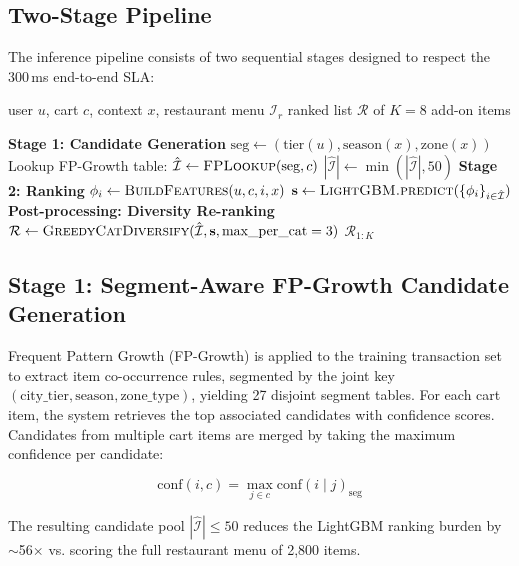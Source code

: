\documentclass[conference]{IEEEtran}
\begin{document}
\subsection{Two-Stage Pipeline}

The inference pipeline consists of two sequential stages designed to respect
the 300\,ms end-to-end SLA:

\begin{algorithm}
\caption{CSAO Inference Pipeline}
\begin{algorithmic}[1]
\REQUIRE user $u$, cart $c$, context $x$, restaurant menu $\mathcal{I}_r$
\ENSURE ranked list $\mathcal{R}$ of $K=8$ add-on items

\STATE \textbf{Stage 1: Candidate Generation}
\STATE $\text{seg} \leftarrow (\text{tier}(u), \text{season}(x), \text{zone}(x))$
\STATE Lookup FP-Growth table: $\hat{\mathcal{I}} \leftarrow \textsc{FPLookup}(\text{seg}, c)$
\STATE $|\hat{\mathcal{I}}| \leftarrow \min(|\hat{\mathcal{I}}|, 50)$
\STATE \textbf{Stage 2: Ranking}
  \STATE $\phi_i \leftarrow \textsc{BuildFeatures}(u, c, i, x)$
\ENDFOR
\STATE $\mathbf{s} \leftarrow \textsc{LightGBM.predict}(\{{\phi_i}\}_{i \in \hat{\mathcal{I}}})$
\STATE \textbf{Post-processing: Diversity Re-ranking}
\STATE $\mathcal{R} \leftarrow \textsc{GreedyCatDiversify}(\hat{\mathcal{I}}, \mathbf{s}, \text{max\_per\_cat}=3)$
\RETURN $\mathcal{R}_{1:K}$
\end{algorithmic}
\end{algorithm}

\subsection{Stage 1: Segment-Aware FP-Growth Candidate Generation}

Frequent Pattern Growth (FP-Growth) \cite{han2000mining} is applied to the
training transaction set to extract item co-occurrence rules, segmented by
the joint key $(\text{city\_tier}, \text{season}, \text{zone\_type})$, yielding
27 disjoint segment tables. For each cart item, the system retrieves the top
associated candidates with confidence scores. Candidates from multiple cart
items are merged by taking the maximum confidence per candidate:

\begin{equation}
  \text{conf}(i, c) = \max_{j \in c} \text{conf}(i \mid j)_\text{seg}
\end{equation}

The resulting candidate pool $|\hat{\mathcal{I}}| \leq 50$ reduces the
LightGBM ranking burden by $\sim$56$\times$ vs. scoring the full restaurant
menu of 2,800 items.
\end{document}
